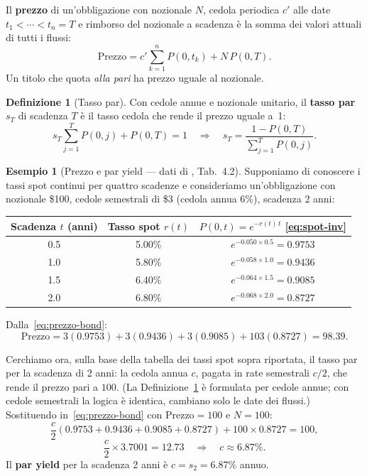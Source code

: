 \documentclass[11pt,a4paper]{article}
\theoremstyle{plain}
\theoremstyle{definition}
\newtheorem{definizione}[teorema]{Definizione}
\newtheorem{esempio}[teorema]{Esempio}
\theoremstyle{remark}
\begin{document}
Il \textbf{prezzo} di un'obbligazione con nozionale $N$, cedola periodica $c'$ alle
date $t_1 < \cdots < t_n = T$ e rimborso del nozionale a scadenza \`e la somma dei valori
attuali di tutti i flussi:
\begin{equation}
  \text{Prezzo} = c' \sum_{k=1}^{n} P(0,t_k) + N\,P(0,T).
  \label{eq:prezzo-bond}
\end{equation}
Un titolo che quota \emph{alla pari} ha prezzo uguale al nozionale.
\begin{definizione}[Tasso par]
\label{def:par}
Con cedole annue e nozionale unitario, il \textbf{tasso par} $s_T$ di scadenza $T$ \`e
il tasso cedola che rende il prezzo uguale a~1:
\begin{equation}
  \label{eq:tasso_par}
  s_T \sum_{j=1}^{T} P(0,j) + P(0,T) = 1
  \quad\Longrightarrow\quad
  s_T = \frac{1 - P(0,T)}{\displaystyle\sum_{j=1}^{T} P(0,j)}.
\end{equation}
\end{definizione}
\begin{esempio}[Prezzo e par yield --- dati di \cite{hull2018}, Tab.~4.2]
\label{ex:hull42}
Supponiamo di conoscere i tassi spot continui per quattro scadenze e consideriamo un'obbligazione con nozionale \$100, cedole semestrali di \$3 (cedola
annua 6\%), scadenza 2 anni:
\begin{center}\small
\renewcommand{\arraystretch}{1.2}
\begin{tabular}{ccc}
\toprule
Scadenza $t$ (anni) & Tasso spot $r(t)$ & $P(0,t) = e^{-r(t)\,t}$ \eqref{eq:spot-inv} \\
\midrule
0.5 & 5.00\% & $e^{-0.050\times 0.5} = 0.9753$ \\
1.0 & 5.80\% & $e^{-0.058\times 1.0} = 0.9436$ \\
1.5 & 6.40\% & $e^{-0.064\times 1.5} = 0.9085$ \\
2.0 & 6.80\% & $e^{-0.068\times 2.0} = 0.8727$ \\
\bottomrule
\end{tabular}
\end{center}

 Dalla~\eqref{eq:prezzo-bond}:
\[
  \text{Prezzo}
  = 3(0.9753) + 3(0.9436) + 3(0.9085) + 103(0.8727)
  = 98.39.
\]

Cerchiamo ora, sulla base della tabella dei tassi spot sopra riportata, il tasso par per la
scadenza di 2 anni: la cedola annua $c$, pagata in rate semestrali $c/2$, che rende il
prezzo pari a $100$. (La Definizione~\ref{def:par} \`e formulata per cedole annue; con
cedole semestrali la logica \`e identica, cambiano solo le date dei flussi.)
Sostituendo in~\eqref{eq:prezzo-bond} con $\text{Prezzo}=100$ e $N=100$:
\[
  \frac{c}{2}(0.9753 + 0.9436 + 0.9085 + 0.8727) + 100\times 0.8727 = 100,
\]
\[
  \frac{c}{2}\times 3.7001 = 12.73
  \quad\Longrightarrow\quad
  c \approx 6.87\%.
\]
Il \textbf{par yield} per la scadenza 2 anni \`e $c = s_2 = 6.87\%$ annuo.%
\end{esempio}
\end{document}

